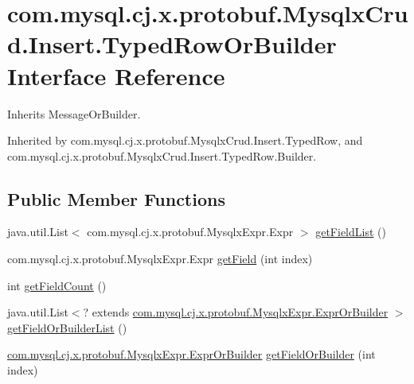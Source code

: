 \hypertarget{interfacecom_1_1mysql_1_1cj_1_1x_1_1protobuf_1_1_mysqlx_crud_1_1_insert_1_1_typed_row_or_builder}{}\section{com.\+mysql.\+cj.\+x.\+protobuf.\+Mysqlx\+Crud.\+Insert.\+Typed\+Row\+Or\+Builder Interface Reference}
\label{interfacecom_1_1mysql_1_1cj_1_1x_1_1protobuf_1_1_mysqlx_crud_1_1_insert_1_1_typed_row_or_builder}


Inherits Message\+Or\+Builder.



Inherited by com.\+mysql.\+cj.\+x.\+protobuf.\+Mysqlx\+Crud.\+Insert.\+Typed\+Row, and com.\+mysql.\+cj.\+x.\+protobuf.\+Mysqlx\+Crud.\+Insert.\+Typed\+Row.\+Builder.

\subsection*{Public Member Functions}
\begin{DoxyCompactItemize}
\item 
java.\+util.\+List$<$ com.\+mysql.\+cj.\+x.\+protobuf.\+Mysqlx\+Expr.\+Expr $>$ \mbox{\hyperlink{interfacecom_1_1mysql_1_1cj_1_1x_1_1protobuf_1_1_mysqlx_crud_1_1_insert_1_1_typed_row_or_builder_a9d5cfad27181be47f4eeee2cff2cab5b}{get\+Field\+List}} ()
\item 
com.\+mysql.\+cj.\+x.\+protobuf.\+Mysqlx\+Expr.\+Expr \mbox{\hyperlink{interfacecom_1_1mysql_1_1cj_1_1x_1_1protobuf_1_1_mysqlx_crud_1_1_insert_1_1_typed_row_or_builder_acf916e276d0f6535a97f197429a2c2cf}{get\+Field}} (int index)
\item 
int \mbox{\hyperlink{interfacecom_1_1mysql_1_1cj_1_1x_1_1protobuf_1_1_mysqlx_crud_1_1_insert_1_1_typed_row_or_builder_a7483b2886dc1611b06a476d64a7fb244}{get\+Field\+Count}} ()
\item 
java.\+util.\+List$<$? extends \mbox{\hyperlink{interfacecom_1_1mysql_1_1cj_1_1x_1_1protobuf_1_1_mysqlx_expr_1_1_expr_or_builder}{com.\+mysql.\+cj.\+x.\+protobuf.\+Mysqlx\+Expr.\+Expr\+Or\+Builder}} $>$ \mbox{\hyperlink{interfacecom_1_1mysql_1_1cj_1_1x_1_1protobuf_1_1_mysqlx_crud_1_1_insert_1_1_typed_row_or_builder_a0d0b9398d7b4753031f6af74f37e22d6}{get\+Field\+Or\+Builder\+List}} ()
\item 
\mbox{\hyperlink{interfacecom_1_1mysql_1_1cj_1_1x_1_1protobuf_1_1_mysqlx_expr_1_1_expr_or_builder}{com.\+mysql.\+cj.\+x.\+protobuf.\+Mysqlx\+Expr.\+Expr\+Or\+Builder}} \mbox{\hyperlink{interfacecom_1_1mysql_1_1cj_1_1x_1_1protobuf_1_1_mysqlx_crud_1_1_insert_1_1_typed_row_or_builder_a21dd5629cba1511de445ce27787df45d}{get\+Field\+Or\+Builder}} (int index)
\end{DoxyCompactItemize}


